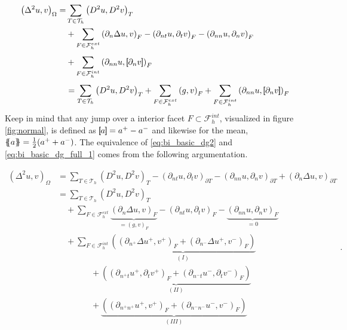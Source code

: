 \begin{equation}
\label{eq:bi_basic_dg_full_1}
\begin{split}
\left( \Delta  ^{2} u, v \right) _{\Omega } =& \sum_{T \in  \mathcal{T} _{h}}^{} \left( D^2u, D^2v \right)_{T}    \\
& + \sum_{F \in \mathcal{F}_{h}^{ext}}  \left(\partial _{n} \Delta u, v  \right) _{F} - \left(\partial _{nt} u, \partial _{t} v \right) _{F}-
\left( \partial _{nn} u, \partial _{n} v \right)_{F}  \\
& + \sum_{F \in \mathcal{F}_{h}  ^{int}}^{} \left(\partial _{nn} u , \jump{ \partial _{n} v }
\right)_{F} \\
& = \sum_{T \in  \mathcal{T} _{h}}^{} \left( D^2u, D^2v \right)_{T} + \sum_{F \in
\mathcal{F} ^{ext}_{h}}^{} \left(g, v  \right) _{F}
  + \sum_{F \in \mathcal{F}_{h}  ^{int}}^{} \left( \partial _{nn} u , \jump{ \partial_{n} v } \right)_{F}
\end{split}
\end{equation}
Keep in mind that any jump over a interior facet $F \subset \mathcal{F} _{h}^{int}   $, visualized in figure \ref{fig:normal}, is defined as $\left[\!\!\left[  a  \right]\!\!\right] =    a^{+} - a^{-} $
and likewise for the mean, $\left\{\!\!\left\{ a  \right\}\!\!\right\} = \frac{1}{2}(   a^{+}
+ a^{-})$.    The equivalence of \eqref{eq:bi_basic_dg2} and \eqref{eq:bi_basic_dg_full_1} comes from the following argumentation.

\begin{equation*}
    \begin{split}
 \left( \Delta  ^{2} u,v \right) _{\Omega } & =\sum_{T\in \mathcal{T} _{h}}^{} \left( D^2u,D^2v \right) _{T } - \left(\partial _{nt} u, \partial _{t}v
\right)_{\partial T} - \left(\partial _{nn} u, \partial _{n}v \right)_{\partial T} + \left(\partial _{n} \Delta  u,v
\right)_{\partial T} \\
&= \sum_{T\in \mathcal{T} _{h}}^{} \left( D^2u,D^2v \right) _{T } \\
&  \quad + \sum_{F \in \mathcal{F}_{h}^{ext} }^{} \underbrace{\left( \partial _{n} \Delta  u, v  \right)_{F}}_{= \left( g,v \right)_{F} }  -  \left(
\partial _{nt} u, \partial _{t} v \right) _{F}  - \underbrace{\left( \partial _{nn} u, \partial _{n} v \right)_{F}}_{ = 0}    \\
& \quad  + \sum_{F \in \mathcal{F} _{h}^{int}}^{} \underbrace{\left( \left(\partial _{n^{+}} \Delta  u^{+}
        ,v^{+}\right)_{F}
+ \left(\partial _{n^{-}} \Delta  u^{+} ,v^{-}\right)_{F}  \right)}_{(I)} \\
 & \quad \quad \quad  \quad +
\underbrace{\left( \left(\partial _{n^{+}t} u^{+}, \partial_{t} v^{+} \right)_{F} +  \left(\partial _{n^{-}t} u^{-},
        \partial_{t} v^{-}
\right)_{F}  \right) }_{(II)} \\
 & \quad \quad \quad  \quad  +
\underbrace{\left( \left(\partial _{n^{+}n^{+}} u^{+}, v^{+} \right) _{F} + \left(\partial _{n^{-}n^{-}} u^{-}, v^{-}
\right) _{F} \right) }_{(III)}
    \end{split}
.\end{equation*}

